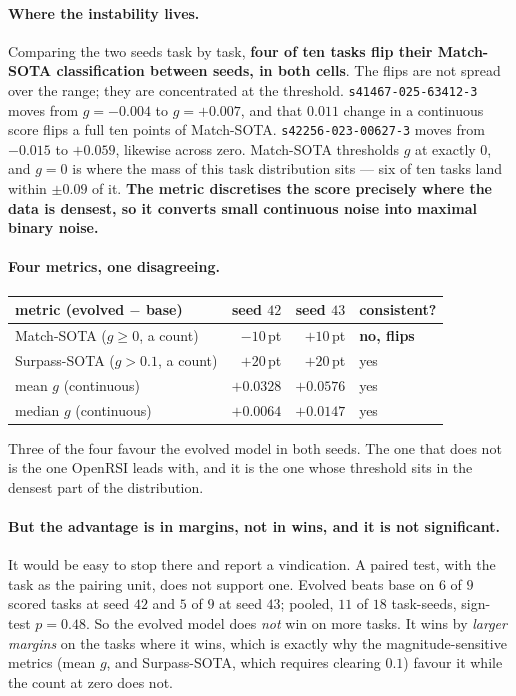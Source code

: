 \paragraph{Where the instability lives.}
Comparing the two seeds task by task, \textbf{four of ten tasks flip their Match-SOTA
classification between seeds, in both cells}. The flips are not spread over the range; they
are concentrated at the threshold. \texttt{s41467-025-63412-3} moves from $g = -0.004$ to
$g = +0.007$, and that $0.011$ change in a continuous score flips a full ten points of
Match-SOTA. \texttt{s42256-023-00627-3} moves from $-0.015$ to $+0.059$, likewise across zero.
Match-SOTA thresholds $g$ at exactly $0$, and $g = 0$ is where the mass of this task
distribution sits --- six of ten tasks land within $\pm 0.09$ of it. \textbf{The metric
discretises the score precisely where the data is densest, so it converts small continuous
noise into maximal binary noise.}

\paragraph{Four metrics, one disagreeing.}
\begin{center}
\begin{tabular}{lrrl}
\toprule
metric (evolved $-$ base) & seed $42$ & seed $43$ & consistent? \\
\midrule
Match-SOTA ($g \ge 0$, a count)      & $-10$\,pt & $+10$\,pt & \textbf{no, flips} \\
Surpass-SOTA ($g > 0.1$, a count)    & $+20$\,pt & $+20$\,pt & yes \\
mean $g$ (continuous)                & $+0.0328$ & $+0.0576$ & yes \\
median $g$ (continuous)              & $+0.0064$ & $+0.0147$ & yes \\
\bottomrule
\end{tabular}
\end{center}

Three of the four favour the evolved model in both seeds. The one that does not is the one
OpenRSI leads with, and it is the one whose threshold sits in the densest part of the
distribution.

\paragraph{But the advantage is in margins, not in wins, and it is not significant.}
It would be easy to stop there and report a vindication. A paired test, with the task as the
pairing unit, does not support one. Evolved beats base on $6$ of $9$ scored tasks at seed $42$
and $5$ of $9$ at seed $43$; pooled, $11$ of $18$ task-seeds, sign-test $p = 0.48$. So the
evolved model does \emph{not} win on more tasks. It wins by \emph{larger margins} on the tasks
where it wins, which is exactly why the magnitude-sensitive metrics (mean $g$, and
Surpass-SOTA, which requires clearing $0.1$) favour it while the count at zero does not.

